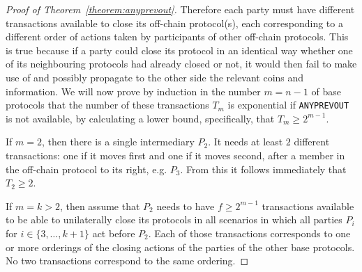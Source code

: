 \begin{proof}[Proof of Theorem~\ref{theorem:anyprevout}]
    Therefore each party must have different transactions available to close its
    off-chain protocol(s), each corresponding to a different order of actions
    taken by participants of other off-chain protocols. This is true because if
    a party could close its protocol in an identical way whether one of its
    neighbouring protocols had already closed or not, it would then fail to make
    use of and possibly propagate to the other side the relevant coins and
    information. We will now prove by induction in the number $m = n - 1$ of
    base protocols that the number of these transactions $T_m$ is exponential if
    \texttt{ANYPREVOUT} is not available, by calculating a lower bound, specifically,
    that $T_m \geq 2^{m-1}$. 

    If $m = 2$, then there is a single intermediary $P_2$. It needs at least $2$
    different transactions: one if it moves first and one if it moves second,
    after a member in the off-chain protocol to its right, e.g. $P_3$.
    From this it follows immediately that $T_2 \geq 2$. 

    If $m = k > 2$, then assume that $P_2$ needs to have $f\geq 2^{m-1}$ transactions
    available to be able to unilaterally close its protocols in all scenarios in
    which all parties $P_i$ for $i \in \{3, \dots, k+1\}$ act before $P_2$. Each
    of those transactions corresponds to one or more orderings of the closing
    actions of the parties of the other base protocols. No two transactions
    correspond to the same ordering.


\end{proof}
